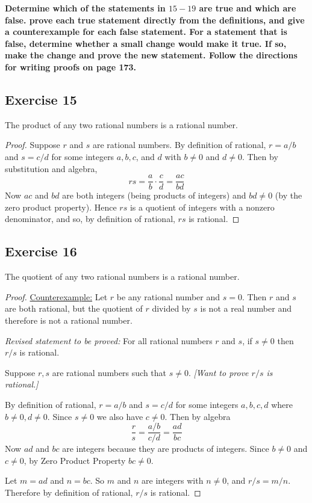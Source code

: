 \documentclass[14pt]{extarticle}
\newcommand{\cy}{\color{cyan}}
\begin{document}
{\bf \cy Determine which of the statements in $15-19$ are true and which are false. prove each true statement directly from the definitions, and give a counterexample for each false statement. For a statement that is false, determine whether a small change would make it true. If so, make the change and prove the new statement. Follow the directions for writing proofs on page 173.}

\subsection{Exercise 15}
The product of any two rational numbers is a rational number.

\begin{proof}
    Suppose $r$ and $s$ are rational numbers. By definition of rational, $r = a/b$ and $s = c/d$ for some integers $a, b, c$, and $d$ with $b \neq 0$ and $d \neq 0$. Then by substitution and algebra,
    \[
        rs = \frac{a}{b} \cdot \frac{c}{d} = \frac{ac}{bd}
    \]
    Now $ac$ and $bd$ are both integers (being products of integers) and $bd \neq 0$ (by the zero product property). Hence $rs$ is a quotient of integers with a nonzero denominator, and so, by definition of rational, $rs$ is rational.
\end{proof}

\subsection{Exercise 16}
The quotient of any two rational numbers is a rational number.

\begin{proof}
    \underline{Counterexample:} Let $r$ be any rational number and $s = 0$. Then $r$ and $s$ are both rational, but the quotient of $r$ divided by $s$ is not a real number and therefore is not a rational number.

        {\it Revised statement to be proved:} For all rational numbers $r$ and $s$, if $s \neq 0$ then $r/s$ is rational.

    Suppose $r,s$ are rational numbers such that $s \neq 0$. {\it[Want to prove $r/s$ is rational.]}

    By definition of rational, $r = a/b$ and $s = c/d$ for some integers $a,b,c,d$ where $b \neq 0, d \neq 0$. Since $s \neq 0$ we also have $c \neq 0$. Then by algebra
    \[
        \frac{r}{s} = \frac{a/b}{c/d} = \frac{ad}{bc}
    \]
    Now $ad$ and $bc$ are integers because they are products of integers. Since $b \neq 0$ and $c \neq 0$, by Zero Product Property $bc \neq 0$.

    Let $m = ad$ and $n = bc$. So $m$ and $n$ are integers with $n \neq 0$, and $r / s = m / n$. Therefore by definition of rational, $r/s$ is rational.
\end{proof}
\end{document}
